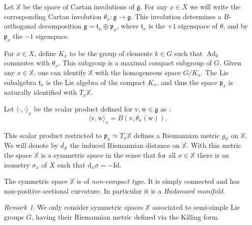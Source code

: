 \documentclass[reqno,10pt]{amsart}
\theoremstyle{plain}
\theoremstyle{definition}
\theoremstyle{remark}
\newtheorem{rem}[thm]{Remark}
\newcommand{\Id}{\text{Id}}
\DeclareMathOperator{\Ad}{Ad}
\newcommand{\X}{\mathbb{X}}
\newcommand{\Y}{\mathbb{Y}}
\newcommand{\ie}{namely }
\begin{document}
\medskip

Let $\X$ be the space of Cartan involutions of $\mathfrak{g}$. For any $x\in X$ we will write the corresponding Cartan involution $\theta_x:\mathfrak{g}\to \mathfrak{g}$. This involution determines a $B$-orthogonal decomposition $\mathfrak{g}=\mathfrak{t}_x\oplus \mathfrak{p}_x$, where $\mathfrak{t}_x$ is the $+1$ eigenspace of $\theta$, and by $\mathfrak{p}_x$ the $-1$ eigenspace. 

\medskip

For $x\in X$, define $K_x$ to be the group of elements $k\in G$ such that $\Ad_k$ commutes with $\theta_x$. This subgroup is a maximal compact subgroup of $G$. Given any $x\in \X$, one can identify $\X$ with the homogeneous space $G/K_x$. The Lie subalgebra $\mathfrak{t}_x$ is the Lie algebra of the compact $K_x$, and thus the space $\mathfrak{p}_x$ is naturally identified with $T_x\X$.

\medskip

Let $\langle\cdot,\cdot\rangle_x$ be the scalar product defined for $\mathrm{v},\mathrm{w}\in \mathfrak{g}$ as :
\begin{equation}
\label{eq:metric}
\langle\mathrm{v},\mathrm{w} \rangle_x=B\left(\mathrm{v},\theta_x(\mathrm{w})\right).
\end{equation}

This scalar product restricted to $\mathfrak{p}_x\simeq T_x\X$ defines a Riemannian metric $g_\X$ on $\X$. We will denote by $d_\X$ the induced Riemannian distance on $\X$. With this metric the space $\X$ is a symmetric space in the sense that for all $x\in \X$ there is an isometry $\sigma_x$ of $X$ such that $\mathrm{d}_x\sigma=-\Id$.

\medskip

The symmetric space $\X$ is of \emph{non-compact type}. It is simply connected and has non-positive sectional curvature. In particular it is a \emph{Hadamard manifold}.

\begin{rem}
We only consider symmetric spaces $\X$ associated to semi-simple Lie groups $G$, having their Riemannian metric defined via the Killing form. %
\end{rem}
\end{document}
